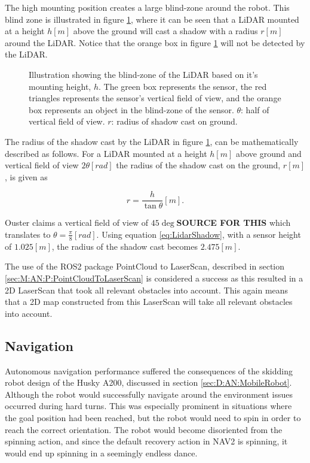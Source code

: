 The high mounting position creates a large blind-zone around the robot. This blind zone is illustrated in figure \ref{fig:D:AN:P:LidarShadow}, where it can be seen that a LiDAR mounted at a height $h[m]$ above the ground will cast a shadow with a radius $r[m]$ around the LiDAR. Notice that the orange box in figure \ref{fig:D:AN:P:LidarShadow} will not be detected by the LiDAR.

\begin{figure}[ht]
  \centering
  
  \caption{Illustration showing the blind-zone of the LiDAR based on it's mounting height, $h$. The green box represents the sensor, the red triangles represents the sensor's vertical field of view, and the orange box represents an object in the blind-zone of the sensor. $\theta$: half of vertical field of view. $r$: radius of shadow cast on ground.}
  \label{fig:D:AN:P:LidarShadow}
\end{figure}

The radius of the shadow cast by the LiDAR in figure \ref{fig:D:AN:P:LidarShadow}, can be mathematically described as follows. For a LiDAR mounted at a height $h[m]$ above ground and vertical field of view $2\theta[rad]$ the radius of the shadow cast on the ground, $r[m]$, is given as

\begin{equation} \label{eq:LidarShadow}
    r = \frac{h}{\tan{\theta}}[m].
\end{equation}

Ouster claims a vertical field of view of $45\deg$\textbf{SOURCE FOR THIS} which translates to $\theta=\frac{\pi}{8}[rad]$. Using equation \ref{eq:LidarShadow}, with a sensor height of $1.025[m]$, the radius of the shadow cast becomes $2.475[m]$.

The use of the ROS2 package PointCloud to LaserScan, described in section \ref{sec:M:AN:P:PointCloudToLaserScan} is considered a success as this resulted in a 2D LaserScan that took all relevant obstacles into account. This again means that a 2D map constructed from this LaserScan will take all relevant obstacles into account.

\subsection{Navigation}\label{sec:D:AN:Navigation}
Autonomous navigation performance suffered the consequences of the skidding robot design of the Husky A200, discussed in section \ref{sec:D:AN:MobileRobot}. Although the robot would successfully navigate around the environment issues occurred during hard turns. This was especially prominent in situations where the goal position had been reached, but the robot would need to spin in order to reach the correct orientation. The robot would become disoriented from the spinning action, and since the default recovery action in NAV2 is spinning, it would end up spinning in a seemingly endless dance.

